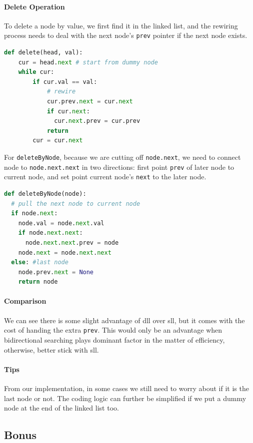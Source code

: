 \documentclass[../main.tex]{subfiles}
\begin{document}
\paragraph{Delete Operation} 
To delete a node by value, we first find it in the linked list, and the rewiring process needs to deal with the next node's \texttt{prev} pointer if the next node exists.
\begin{lstlisting}[language=Python]
def delete(head, val):
    cur = head.next # start from dummy node
    while cur:
        if cur.val == val:
            # rewire
            cur.prev.next = cur.next
            if cur.next:
              cur.next.prev = cur.prev
            return
        cur = cur.next
\end{lstlisting}
For \texttt{deleteByNode}, because we are cutting off \texttt{node.next}, we need to connect node to \texttt{node.next.next} in two directions: first point \texttt{prev} of later node to current node, and set point current node's \texttt{next} to the later node.
\begin{lstlisting}[language=Python]
def deleteByNode(node):
  # pull the next node to current node
  if node.next:
    node.val = node.next.val
    if node.next.next:
      node.next.next.prev = node
    node.next = node.next.next
  else: #last node
    node.prev.next = None
    return node
\end{lstlisting}

\paragraph{Comparison} We can see there is some slight advantage of dll over sll, but it comes with the cost of handing the extra \texttt{prev}. This would only be an advantage when bidirectional searching plays dominant factor in the matter of efficiency, otherwise, better stick with sll. 

\paragraph{Tips} From our implementation, in some cases we still need to worry about if it is the last node or not. The coding logic can further be simplified if we put a dummy node at the end of the linked list too.



\subsection{Bonus}
\end{document}
